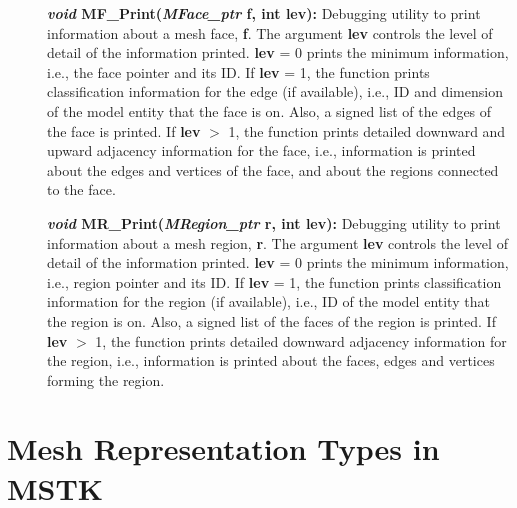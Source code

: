 \documentclass[12pt]{article}
\begin{document}
\begin{description}
  \item[]\textbf{\textit{void} MF\_Print(\textit{MFace\_ptr} f, int
      lev):} Debugging utility to print information about a mesh face,
    \textbf{f}. The argument \textbf{lev} controls the level of detail
    of the information printed. \textbf{lev} = 0 prints the minimum
    information, i.e., the face pointer and its ID. If \textbf{lev} =
    1, the function prints classification information for the edge (if
    available), i.e., ID and dimension of the model entity that the
    face is on. Also, a signed list of the edges of the face is
    printed.  If \textbf{lev} $>$ 1, the function prints detailed
    downward and upward adjacency information for the face, i.e.,
    information is printed about the edges and vertices of the face,
    and about the regions connected to the face.
    
  \item[]\textbf{\textit{void} MR\_Print(\textit{MRegion\_ptr} r, int
      lev):} Debugging utility to print information about a mesh
    region, \textbf{r}. The argument \textbf{lev} controls the level
    of detail of the information printed. \textbf{lev} = 0 prints the
    minimum information, i.e., region pointer and its ID. If
    \textbf{lev} = 1, the function prints classification information
    for the region (if available), i.e., ID of the model entity that
    the region is on. Also, a signed list of the faces of the region
    is printed. If \textbf{lev} $>$ 1, the function prints detailed
    downward adjacency information for the region, i.e., information
    is printed about the faces, edges and vertices forming the region.



\end{description}

\newpage
\appendix

\section{Mesh Representation Types  in MSTK}
\label{app:reptypes}
\end{document}
